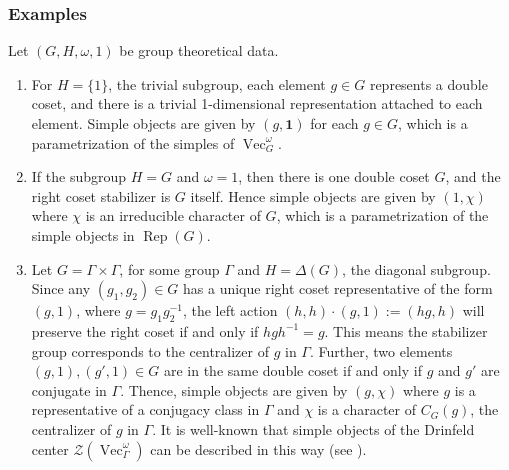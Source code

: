 \documentclass[11pt]{book}
\theoremstyle{Rem}
\theoremstyle{definition}
\numberwithin{equation}{section}
\newcommand\inv{^{-1}}
\newcommand\Rep{\operatorname{Rep}}
\newcommand\Vect{\operatorname{Vec}}
\newcommand\CTR{\mathcal Z}
\newcommand\one{\mathbf{1}}
\begin{document}
\subsubsection{Examples}\label{examples} Let $(G, H, \omega, 1)$ be group theoretical data.
\begin{enumerate}
	\item For $H=\{1\}$, the trivial subgroup, each element $g\in G$ represents a double coset, and there is a trivial 1-dimensional representation attached to each element. Simple objects are given by $(g, \one)$ for each $g\in G$, which is a parametrization of the simples of $\Vect^\omega_G$.
	\item  If the subgroup $H =G$ and $\omega=1$, then there is one double coset $G$, and the right coset stabilizer is $G$ itself. Hence simple objects are given by $(1, \chi)$ where $\chi$ is an irreducible character of $G$, which is a parametrization of the simple objects in $\Rep (G)$.
	\item\label{groupdouble} Let $G= \Gamma \times \Gamma$, for some group $\Gamma$ and $H = \Delta(G)$, the diagonal subgroup. Since any $(g_1, g_2)\in G$ has a unique right coset representative of the form $(g,1)$, where $g=g_1g_2\inv$,  the left action $(h,h) \cdot (g, 1) := (hg, h)$ will preserve the right coset if and only if $hgh\inv =g$. This means the stabilizer group corresponds to the centralizer of $g$ in $\Gamma$. Further, two elements $(g,1), (g',1) \in G$ are in the same double coset if and only if $g$ and $g'$ are conjugate in $\Gamma$. Thence, simple objects are given by $(g, \chi)$ where $g$ is a representative of a conjugacy class in $\Gamma$ and $\chi$ is a character of $C_G(g)$, the centralizer of $g$ in $\Gamma$. It is well-known that simple objects of the Drinfeld center $\CTR(\Vect^\omega_\Gamma)$ can be described in this way (see \cite{Ost:MCWHAMI}). 
\end{enumerate}
\end{document}
